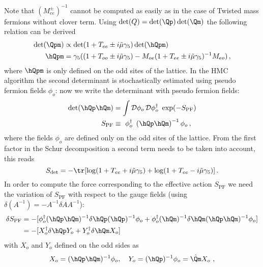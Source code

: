 Note that $(M_{ee}^\pm)^{-1}$ cannot be computed as easily as in the
case of Twisted mass fermions without clover term.
Using $\det(Q)=\det(\Qp)\det(\Qm)$ the following relation can be derived
\begin{equation}
  \label{eq:eosw4}
  \begin{split}
    \det(\Qpm) &\propto \det(1+T_{ee} \pm i\tilde\mu\gamma_5)\det(\hQpm) \\
    \hQpm &= \gamma_5((1 + T_{oo} \pm i\tilde\mu\gamma_5) -
             M_{oe}( 1 + T_{ee} \pm i\tilde\mu\gamma_5 )^{-1}M_{eo})\, ,
  \end{split}
\end{equation}
where $\hQpm$ is only defined on the odd sites of the lattice. In the
HMC algorithm the second determinant is stochastically estimated using
pseudo fermion fields $\phi_o$: now we write the determinant with
pseudo fermion fields:
\begin{equation}
  \begin{split}
    \det(\hQp \hQm) &= \int \mathcal{D}\phi_o\,\mathcal{D}\phi^\dagger_o\
    \exp(-S_\mathrm{PF})\\
    S_\mathrm{PF} &\equiv\ \phi_o^\dagger\ \left(\hQp\hQm\right)^{-1}\phi_o\, ,
  \end{split}
\end{equation}
where the fields $\phi_o$ are defined only on the odd sites of the
lattice. From the first factor in the Schur decomposition a second
term needs to be taken into account, this reads
\begin{equation}
  \label{eq:swdet}
  S_{\det} =  - \tr[\log(1+T_{ee} + i\tilde\mu\gamma_5) +
  \log(1+T_{ee} - i\tilde\mu\gamma_5)]\, .
\end{equation}
In order to compute the force corresponding to the effective
action $S_\mathrm{PF}$ we need the variation of $S_\mathrm{PF}$ with
respect to the gauge fields 
(using $\delta (A^{-1})=-A^{-1}\delta A A^{-1}$):
\begin{equation}
  \label{eq:eosw5}
  \begin{split}
    \delta S_\mathrm{PF} &= -[\phi_o^\dagger (\hQp \hQm)^{-1}\delta \hQp(\hQp)^{-1}\phi_o +
    \phi_o^\dagger(\hQm)^{-1}\delta \hQm (\hQp \hQm)^{-1} \phi_o ] \\
     &= -[X_o^\dagger \delta \hQp Y_o + Y_o^\dagger \delta\hQm X_o]
  \end{split}
\end{equation}
with $X_o$ and $Y_o$ defined on the odd sides as 
\begin{equation}
  \label{eq:eosw6}
  X_o = (\hQp \hQm)^{-1} \phi_o,\quad Y_o = (\hQp)^{-1}\phi_o=\hat
  \Qm X_o\ ,
\end{equation}
